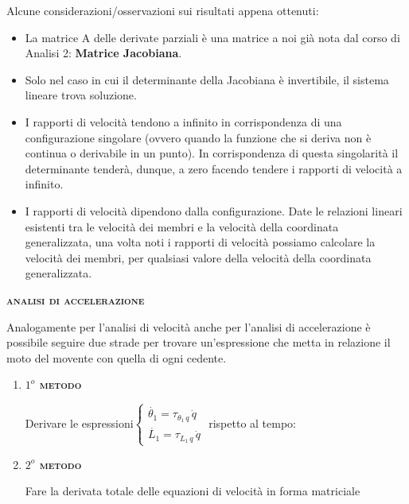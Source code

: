 	Alcune considerazioni/osservazioni sui risultati appena ottenuti:
	\begin{itemize}
	\item La matrice A delle derivate parziali è una matrice a noi già nota dal corso di Analisi 2: \textbf{Matrice Jacobiana}.
	\item Solo nel caso in cui il determinante della Jacobiana è invertibile, il sistema lineare trova soluzione.
	\item I rapporti di velocità tendono a infinito in corrispondenza di una configurazione singolare (ovvero quando la funzione che si deriva non è continua o derivabile in un punto).
	In corrispondenza di questa singolarità il determinante tenderà, dunque, a zero facendo tendere i rapporti di velocità a infinito.
	\item I rapporti di velocità dipendono dalla configurazione. Date le relazioni lineari esistenti tra le velocità dei membri e la velocità della coordinata generalizzata, una volta noti i rapporti di velocità possiamo calcolare la velocità dei membri, per qualsiasi valore della velocità della coordinata generalizzata.
	\end{itemize}
	
	\begin{center}
		{\scshape{\bfseries analisi di accelerazione}}
	\end{center}
			
	
Analogamente per l'analisi di velocità anche per l'analisi di accelerazione è possibile seguire due strade per trovare un'espressione che metta in relazione il moto del movente con quella di ogni cedente.
\begin{enumerate}
	\item {\scshape{\bfseries $1^o$ metodo}}
	
	Derivare le espressioni\hspace{4mm}$
	\begin{cases}
		\dot{\theta_1} = \tau_{\theta_1\,q}\,\dot{q}\\
		\dot{L_1} = \tau_{L_1\,q}\,\dot{q}
	\end{cases}
	$\hspace{4mm} rispetto al tempo:
	\item  {\scshape{\bfseries $2^o$ metodo}}
	
	Fare la derivata totale delle equazioni di velocità in forma matriciale
\end{enumerate}
	
